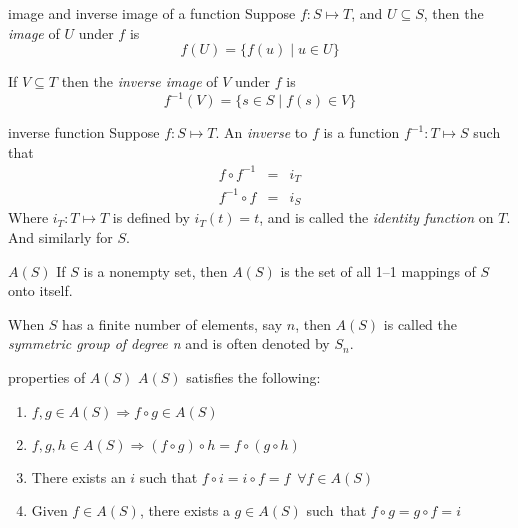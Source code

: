 \documentclass[avery5371,grid]{flashcards}
\begin{document}
\begin{flashcard}[Definition]{image and inverse image of a function}
Suppose $f: S\mapsto T$, and $U\subseteq S$, then the \textit{image}
of $U$ under $f$ is
\begin{equation*}
f(U)=\lbrace f(u)\mid u\in U\rbrace
\end{equation*}

\bigskip
If $V\subseteq T$ then the \textit{inverse image} of $V$ under $f$ is
\begin{equation*}
f^{-1}(V) = \lbrace s\in S \mid f(s) \in V\rbrace
\end{equation*}
\end{flashcard}

\begin{flashcard}[Definition]{inverse function}
Suppose $f: S\mapsto T$.  An \textit{inverse} to $f$ is a function
$f^{-1}:T\mapsto S$ such that
\begin{eqnarray*}
f\circ f^{-1} &=& i_T\\
f^{-1}\circ f &=& i_S
\end{eqnarray*}
Where $i_T:T\mapsto T$ is defined by $i_T(t) = t$, and is called the
\textit{identity function} on $T$.  And similarly for $S$. 
\end{flashcard}

\begin{flashcard}[Definition]{$A(S)$}
If $S$ is a nonempty set, then $A(S)$ is the set of all 1--1 mappings of $S$
onto itself.

\medskip
When $S$ has a finite number of elements, say $n$, then $A(S)$ is called the
\textit{symmetric group of degree n} and is often denoted by $S_n$.
\end{flashcard}

\begin{flashcard}[Lemma]{properties of $A(S)$}
$A(S)$ satisfies the following:
\begin{enumerate}
\item $f,g \in A(S)\Rightarrow f\circ g \in A(S)$
\item $f,g,h \in A(S)\Rightarrow (f\circ g)\circ h = f\circ (g\circ h)$
\item There exists an $i$ such that $f\circ i = i\circ f = f$\
$\forall f \in A(S)$
\item Given $f \in A(S)$, there exists a $g \in A(S)$ such~that 
$f\circ g = g\circ f = i$ 
\end{enumerate}
\end{flashcard}
\end{document}
